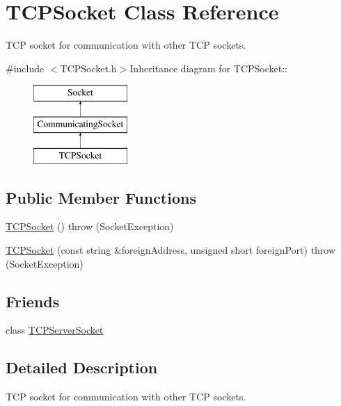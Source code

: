 \hypertarget{classTCPSocket}{
\section{TCPSocket Class Reference}
\label{classTCPSocket}
}


TCP socket for communication with other TCP sockets.  


{\ttfamily \#include $<$TCPSocket.h$>$}Inheritance diagram for TCPSocket::\begin{figure}[H]
\begin{center}
\leavevmode
\includegraphics[height=3cm]{classTCPSocket}
\end{center}
\end{figure}
\subsection*{Public Member Functions}
\begin{DoxyCompactItemize}
\item 
\hyperlink{classTCPSocket_a7a50427a401d1a6f3209d51818bad901}{TCPSocket} ()  throw (SocketException)
\item 
\hyperlink{classTCPSocket_a7b246b66f6dc3246ab2777b771e5f917}{TCPSocket} (const string \&foreignAddress, unsigned short foreignPort)  throw (SocketException)
\end{DoxyCompactItemize}
\subsection*{Friends}
\begin{DoxyCompactItemize}
\item 
\hypertarget{classTCPSocket_ae8bcdc0d25881a17b23e557296236fa9}{
class \hyperlink{classTCPSocket_ae8bcdc0d25881a17b23e557296236fa9}{TCPServerSocket}}
\label{classTCPSocket_ae8bcdc0d25881a17b23e557296236fa9}

\end{DoxyCompactItemize}


\subsection{Detailed Description}
TCP socket for communication with other TCP sockets. 

